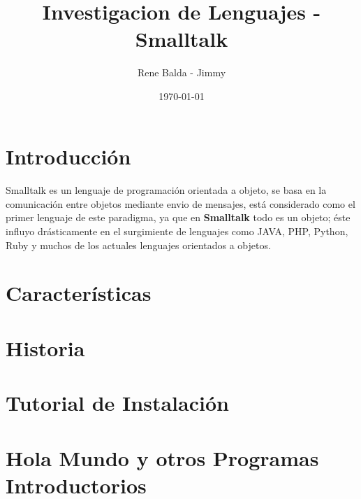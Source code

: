 \documentclass[11pt]{article}
\title{Investigacion de Lenguajes - Smalltalk}
\author{Rene Balda - Jimmy}
\date{\today}
\begin{document}
\maketitle
\section{Introducción} 
\paragraph{} \noindent
Smalltalk es un lenguaje de programación orientada a objeto, se basa en la comunicación entre objetos mediante envio de mensajes, está considerado como el primer lenguaje de este paradigma, ya que  en \textbf{Smalltalk} todo es un objeto; éste influyo drásticamente en el surgimiente de lenguajes como JAVA, PHP, Python, Ruby y muchos de los actuales lenguajes orientados a objetos.
\section{Características}
\section{Historia}
\section{Tutorial de Instalación}
\section{Hola Mundo y otros Programas Introductorios}
\end{document}
